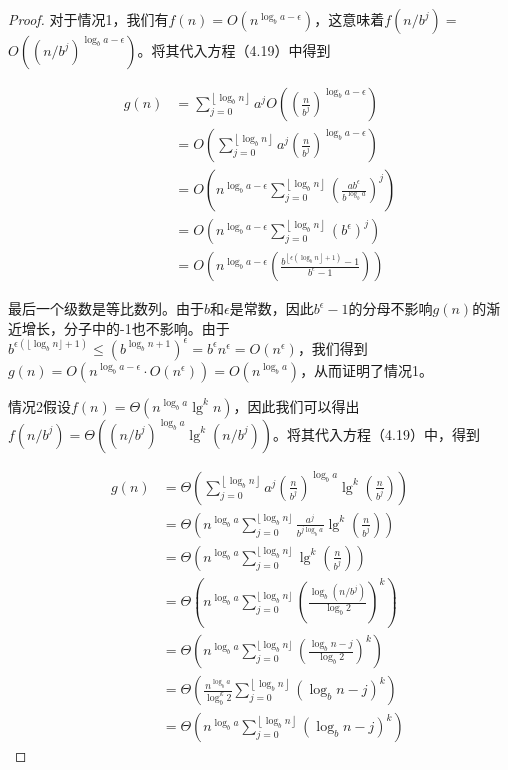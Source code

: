 \documentclass[lang=cn,newtx,10pt,scheme=chinese]{elegantbook}
\begin{document}
\begin{proof}
对于情况1，我们有$f(n)=O(n^{\log _b a-\epsilon})$，这意味着$f(n / b^j)=$ $O((n/b^j)^{\log _b a-\epsilon})$。将其代入方程（4.19）中得到

$$
\begin{aligned}
g(n) & =\sum_{j=0}^{\left\lfloor\log _b n\right\rfloor} a^j O\left(\left(\frac{n}{b^j}\right)^{\log _b a-\epsilon}\right) \\
& =O(\sum_{j=0}^{\left\lfloor\log _b n\right\rfloor} a^j\left(\frac{n}{b^j}\right)^{\log _b a-\epsilon}) \\
& =O(n^{\log _b a-\epsilon} \sum_{j=0}^{\left\lfloor\log _b n\right\rfloor}\left(\frac{a b^\epsilon}{b^{\log _b a}}\right)^j) \\
& =O(n^{\log _b a-\epsilon} \sum_{j=0}^{\left\lfloor\log _b n\right\rfloor}\left(b^\epsilon\right)^j) \\
& =O(n^{\log _b a-\epsilon}\left(\frac{b^{\left\lfloor\epsilon\left(\log _b n\right\rfloor+1\right)}-1}{b^\epsilon-1}\right))
\end{aligned}
$$

最后一个级数是等比数列。由于$b$和$\epsilon$是常数，因此$b^\epsilon-1$的分母不影响$g(n)$的渐近增长，分子中的-1也不影响。由于$b^{\epsilon(\lfloor\log _b n\rfloor+1)} \leq(b^{\log _b n+1})^\epsilon=b^\epsilon n^\epsilon=O(n^\epsilon)$，我们得到$g(n)=O(n^{\log _b a-\epsilon} \cdot O(n^\epsilon))=O(n^{\log _b a})$，从而证明了情况1。

情况2假设$f(n)=\Theta(n^{\log _b a} \lg ^k n)$，因此我们可以得出$f\left(n / b^j\right)=\Theta\left(\left(n / b^j\right)^{\log _b a} \lg ^k\left(n / b^j\right)\right)$。将其代入方程（4.19）中，得到

$$
\begin{aligned}
g(n) & =\Theta\left(\sum_{j=0}^{\left\lfloor\log _b n\right\rfloor} a^j\left(\frac{n}{b^j}\right)^{\log _b a} \lg ^k\left(\frac{n}{b^j}\right)\right) \\
& =\Theta\left(n^{\log _b a} \sum_{j=0}^{\lfloor\log _b n\rfloor} \frac{a^j}{b^{j \log _b a}} \lg ^k\left(\frac{n}{b^j}\right)\right) \\
& =\Theta\left(n^{\log _b a} \sum_{j=0}^{\lfloor\log _b n\rfloor} \lg ^k\left(\frac{n}{b^j}\right)\right) \\
& =\Theta\left(n^{\log _b a} \sum_{j=0}^{\lfloor\log _b n\rfloor}\left(\frac{\log _b\left(n / b^j\right)}{\log _b 2}\right)^k\right) \\
& =\Theta\left(n^{\log _b a} \sum_{j=0}^{\lfloor\log _b n\rfloor}\left(\frac{\log _b n-j}{\log _b 2}\right)^k\right) \\
& =\Theta\left(\frac{n^{\log _b a}}{\log _b^k 2} \sum_{j=0}^{\left\lfloor\log _b n\right\rfloor}\left(\log _b n-j\right)^k\right) \\
& =\Theta\left(n^{\log _b a} \sum_{j=0}^{\left\lfloor\log _b n\right\rfloor}\left(\log _b n-j\right)^k\right)
\end{aligned}
$$


\end{proof}
\end{document}
